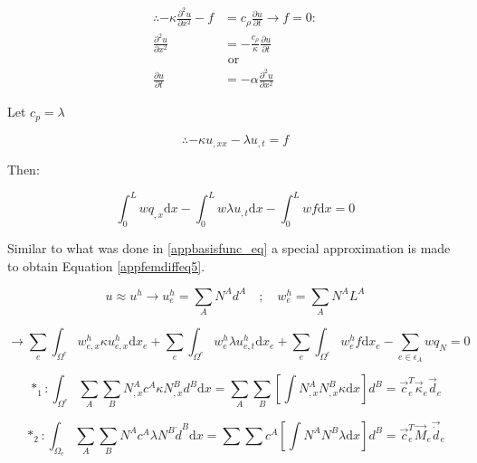 \begin{equation}\label{appfemdiffeq2}
\begin{aligned}
\therefore -\kappa \frac{\partial^2 u}{\partial x^2} - f &= c_{\rho}\frac{\partial u}{\partial t} \rightarrow f=0:\\
\frac{\partial^2 u}{\partial x^2} &= - \frac{c_{\rho}}{\kappa} \frac{\partial u}{\partial t} \quad \\
&\text{ or } \\
\frac{\partial u}{\partial t} &= -\alpha \frac{\partial^2 u}{\partial x^2}
\end{aligned}
\end{equation}


Let $c_p = \lambda$ 

\begin{equation}\label{appfemdiffeq3}
\therefore -\kappa u_{,xx} - \lambda u_{,t} = f
\end{equation}


Then:

\begin{equation}\label{appfemdiffeq4}
\int_0^L w q_{,x} \text{d}x - \int_0^L w \lambda u_{,t} \text{d}x - \int_0^L w f \text{d}x = 0
\end{equation}


Similar to what was done in \ref{appbasisfunc_eq} a special approximation is made to obtain Equation \ref{appfemdiffeq5}.

\begin{equation}\label{appfemdiffeq5}
u \approx u^h \rightarrow u_e^h = \sum_{A}N^A d^A \quad;\quad w_e^h = \sum_{A}N^A L^A
\end{equation}


\begin{equation}\label{appfemdiffeq6}
\rightarrow \sum_e \int_{\Omega^e} w_{e,x}^h \kappa u_{e,x}^h \text{d}x_e + \sum_e \int_{\Omega^e} w_e^h \lambda u_{e,t}^h \text{d}x_e + \sum_e \int_{\Omega^e} w_e^h f \text{d}x_e - \sum_{e \in \epsilon_A} w q_N = 0
\end{equation}

\begin{equation*}
*_1: \int_{\Omega^e} \sum_A \sum_B N_{,x}^A c^A \kappa N_{,x}^B d^B \text{d}x = \sum_A\sum_B \left[ \int N_{,x}^A N_{,x}^B \kappa \text{d}x  \right]d^B = \vec{c}_e^T \vec{\kappa}_e \vec{d}_e
\end{equation*}


\begin{equation*}
*_2: \int_{\Omega_e} \sum_A \sum_B N^A c^A \lambda N^B \dot{d}^B \text{d}x = \sum\sum c^A \left[ \int N^A N^B \lambda \text{d}x \right] d^B = \vec{c}_e^T \vec{M}_e \vec{\dot{d}}_e
\end{equation*}


